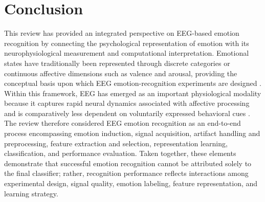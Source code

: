 \documentclass{WileyMSP-template}
\begin{document}
\section{Conclusion}
\label{sec:conclusion}

This review has provided an integrated perspective on EEG-based emotion recognition by connecting the psychological representation of emotion with its neurophysiological measurement and computational interpretation. Emotional states have traditionally been represented through discrete categories or continuous affective dimensions such as valence and arousal, providing the conceptual basis upon which EEG emotion-recognition experiments are designed \cite{russell1980circumplex,alarcao2019eegsurvey}. Within this framework, EEG has emerged as an important physiological modality because it captures rapid neural dynamics associated with affective processing and is comparatively less dependent on voluntarily expressed behavioral cues \cite{lu2021bcisurvey}. The review therefore considered EEG emotion recognition as an end-to-end process encompassing emotion induction, signal acquisition, artifact handling and preprocessing, feature extraction and selection, representation learning, classification, and performance evaluation. Taken together, these elements demonstrate that successful emotion recognition cannot be attributed solely to the final classifier; rather, recognition performance reflects interactions among experimental design, signal quality, emotion labeling, feature representation, and learning strategy.
\end{document}
